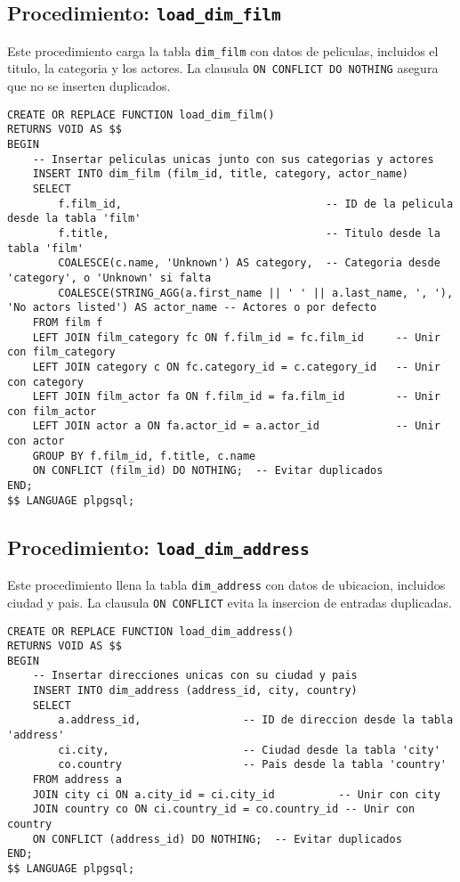 \documentclass{article}
\begin{document}
\newpage
\subsection{Procedimiento: \texttt{load\_dim\_film}}

Este procedimiento carga la tabla \texttt{dim\_film} con datos de peliculas, incluidos el titulo, la categoria y los actores. La clausula \texttt{ON CONFLICT DO NOTHING} asegura que no se inserten duplicados.

\begin{lstlisting}
CREATE OR REPLACE FUNCTION load_dim_film()
RETURNS VOID AS $$
BEGIN
    -- Insertar peliculas unicas junto con sus categorias y actores
    INSERT INTO dim_film (film_id, title, category, actor_name)
    SELECT 
        f.film_id,                                -- ID de la pelicula desde la tabla 'film'
        f.title,                                  -- Titulo desde la tabla 'film'
        COALESCE(c.name, 'Unknown') AS category,  -- Categoria desde 'category', o 'Unknown' si falta
        COALESCE(STRING_AGG(a.first_name || ' ' || a.last_name, ', '), 'No actors listed') AS actor_name -- Actores o por defecto
    FROM film f
    LEFT JOIN film_category fc ON f.film_id = fc.film_id     -- Unir con film_category
    LEFT JOIN category c ON fc.category_id = c.category_id   -- Unir con category
    LEFT JOIN film_actor fa ON f.film_id = fa.film_id        -- Unir con film_actor
    LEFT JOIN actor a ON fa.actor_id = a.actor_id            -- Unir con actor
    GROUP BY f.film_id, f.title, c.name
    ON CONFLICT (film_id) DO NOTHING;  -- Evitar duplicados
END;
$$ LANGUAGE plpgsql;
\end{lstlisting}

\subsection{Procedimiento: \texttt{load\_dim\_address}}

Este procedimiento llena la tabla \texttt{dim\_address} con datos de ubicacion, incluidos ciudad y pais. La clausula \texttt{ON CONFLICT} evita la insercion de entradas duplicadas.

\begin{lstlisting}
CREATE OR REPLACE FUNCTION load_dim_address()
RETURNS VOID AS $$
BEGIN
    -- Insertar direcciones unicas con su ciudad y pais
    INSERT INTO dim_address (address_id, city, country)
    SELECT 
        a.address_id,                -- ID de direccion desde la tabla 'address'
        ci.city,                     -- Ciudad desde la tabla 'city'
        co.country                   -- Pais desde la tabla 'country'
    FROM address a
    JOIN city ci ON a.city_id = ci.city_id          -- Unir con city
    JOIN country co ON ci.country_id = co.country_id -- Unir con country
    ON CONFLICT (address_id) DO NOTHING;  -- Evitar duplicados
END;
$$ LANGUAGE plpgsql;
\end{lstlisting}
\end{document}
